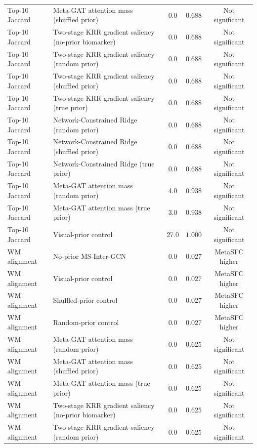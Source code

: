 \begin{table}[t]
\begin{tabular}{llccc}
Top-10 Jaccard & Meta-GAT attention mass (shuffled prior) & 0.0 & $0.688$ & Not significant \\
Top-10 Jaccard & Two-stage KRR gradient saliency (no-prior biomarker) & 0.0 & $0.688$ & Not significant \\
Top-10 Jaccard & Two-stage KRR gradient saliency (random prior) & 0.0 & $0.688$ & Not significant \\
Top-10 Jaccard & Two-stage KRR gradient saliency (shuffled prior) & 0.0 & $0.688$ & Not significant \\
Top-10 Jaccard & Two-stage KRR gradient saliency (true prior) & 0.0 & $0.688$ & Not significant \\
Top-10 Jaccard & Network-Constrained Ridge (random prior) & 0.0 & $0.688$ & Not significant \\
Top-10 Jaccard & Network-Constrained Ridge (shuffled prior) & 0.0 & $0.688$ & Not significant \\
Top-10 Jaccard & Network-Constrained Ridge (true prior) & 0.0 & $0.688$ & Not significant \\
Top-10 Jaccard & Meta-GAT attention mass (random prior) & 4.0 & $0.938$ & Not significant \\
Top-10 Jaccard & Meta-GAT attention mass (true prior) & 3.0 & $0.938$ & Not significant \\
Top-10 Jaccard & Visual-prior control & 27.0 & $1.000$ & Not significant \\
WM alignment & No-prior MS-Inter-GCN & 0.0 & $0.027$ & MetaSFC higher \\
WM alignment & Visual-prior control & 0.0 & $0.027$ & MetaSFC higher \\
WM alignment & Shuffled-prior control & 0.0 & $0.027$ & MetaSFC higher \\
WM alignment & Random-prior control & 0.0 & $0.027$ & MetaSFC higher \\
WM alignment & Meta-GAT attention mass (random prior) & 0.0 & $0.625$ & Not significant \\
WM alignment & Meta-GAT attention mass (shuffled prior) & 0.0 & $0.625$ & Not significant \\
WM alignment & Meta-GAT attention mass (true prior) & 0.0 & $0.625$ & Not significant \\
WM alignment & Two-stage KRR gradient saliency (no-prior biomarker) & 0.0 & $0.625$ & Not significant \\
WM alignment & Two-stage KRR gradient saliency (random prior) & 0.0 & $0.625$ & Not significant \\

\end{tabular}
\end{table}
